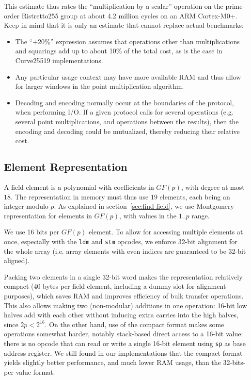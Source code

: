 \documentclass{llncs}
\newcommand{\GF}{GF}
\begin{document}
This estimate thus rates the ``multiplication by a scalar'' operation on
the prime-order Ristretto255 group at about 4.2 million cycles on an
ARM Cortex-M0+. Keep in mind that it is only an estimate that cannot
replace actual benchmarks:
\begin{itemize}

    \item The ``+20\%'' expression assumes that operations other than
    multiplications and squarings add up to about 10\% of the total cost,
    as is the case in Curve25519 implementations.

    \item Any particular usage context may have more available RAM and
    thus allow for larger windows in the point multiplication algorithm.

    \item Decoding and encoding normally occur at the boundaries of the
    protocol, when performing I/O. If a given protocol calls for several
    operations (e.g. several point multiplications, and operations
    between the results), then the encoding and decoding could be
    mutualized, thereby reducing their relative cost.

\end{itemize}

\subsection{Element Representation}\label{sec:field-ops-repr}

A field element is a polynomial with coefficients in $\GF(p)$, with
degree at most $18$. The representation in memory must thus use $19$
elements, each being an integer modulo $p$. As explained in
section~\ref{sec:find-field}, we use Montgomery representation for
elements in $\GF(p)$, with values in the $1$..$p$ range.

We use 16 bits per $\GF(p)$ element. To allow for accessing multiple
elements at once, especially with the \verb+ldm+ and \verb+stm+ opcodes,
we enforce 32-bit alignment for the whole array (i.e. array elements
with even indices are guaranteed to be 32-bit aligned).

Packing two elements in a single 32-bit word makes the representation
relatively compact (40 bytes per field element, including a dummy slot
for alignment purposes), which saves RAM and improves efficiency of bulk
transfer operations. This also allows making two (non-modular) additions
in one operation: 16-bit low halves add with each other without inducing
extra carries into the high halves, since $2p < 2^{16}$. On the other
hand, use of the compact format makes some operations somewhat harder,
notably stack-based direct access to a 16-bit value: there is no opcode
that can read or write a single 16-bit element using \verb+sp+ as base
address register. We still found in our implementations that the compact
format yields slightly better performance, and much lower RAM usage,
than the 32-bits-per-value format.
\end{document}
